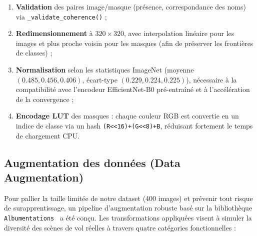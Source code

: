 \begin{enumerate}[leftmargin=2em, itemsep=4pt, label=\textbf{\arabic*.}]
  \item \textbf{Validation} des paires image/masque (présence, correspondance des noms) via \texttt{\_validate\_coherence()} ;
  \item \textbf{Redimensionnement} à $320 \times 320$, avec interpolation linéaire pour les images et plus proche voisin pour les masques (afin de préserver les frontières de classes) ;
  \item \textbf{Normalisation} selon les statistiques ImageNet (moyenne $(0.485, 0.456, 0.406)$, écart-type $(0.229, 0.224, 0.225)$), nécessaire à la compatibilité avec l'encodeur EfficientNet-B0 pré-entraîné et à l'accélération de la convergence ;
  \item \textbf{Encodage LUT} des masques : chaque couleur RGB est convertie en un indice de classe via un hash \texttt{(R<<16)+(G<<8)+B}, réduisant fortement le temps de chargement CPU.
\end{enumerate}

\subsection{Augmentation des données (Data Augmentation)}
\label{subsec:data-augmentation}

Pour pallier la taille limitée de notre dataset (400 images) et prévenir tout risque de surapprentissage, un pipeline d'augmentation robuste basé sur la bibliothèque \texttt{Albumentations}~\cite{buslaev2020albumentations} a été conçu. Les transformations appliquées visent à simuler la diversité des scènes de vol réelles à travers quatre catégories fonctionnelles :

